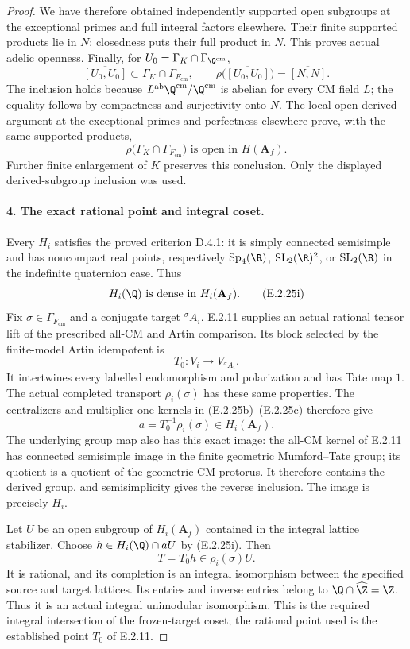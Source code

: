 \begin{proof}
We have therefore obtained independently supported
open subgroups at the exceptional primes and full
integral factors elsewhere. Their finite supported
products lie in \(N\); closedness puts their full
product in \(N\). This proves actual adelic openness.
Finally, for
\(U_0=\Gamma_K\cap\Gamma_{\Q^{\mathrm{cm}}}\),
\[
 \overline{[U_0,U_0]}
       \subset\Gamma_K\cap\Gamma_{F_{\mathrm{cm}}},
 \qquad
 \rho\bigl(\overline{[U_0,U_0]}\bigr)
       =\overline{[N,N]}.
\]
The inclusion holds because
\(L^{\mathrm{ab}}\Q^{\mathrm{cm}}/
\Q^{\mathrm{cm}}\) is abelian for every CM field
\(L\); the equality follows by compactness and
surjectivity onto \(N\). The local open-derived
argument at the exceptional primes and perfectness
elsewhere prove, with the same supported products,
\[
 \rho\bigl(\Gamma_K\cap\Gamma_{F_{\mathrm{cm}}}\bigr)
             \text{ is open in }H(\mathbf A_f).
 \tag{E.2.25h}
\]
Further finite enlargement of \(K\) preserves
this conclusion. Only the displayed derived-subgroup
inclusion was used.

\paragraph{4. The exact rational point and integral coset.}
Every \(H_i\) satisfies the proved criterion D.4.1:
it is simply connected semisimple and has noncompact
real points, respectively \(\operatorname{Sp}_4(\R)\),
\(\operatorname{SL}_2(\R)^2\), or
\(\operatorname{SL}_2(\R)\) in the indefinite
quaternion case. Thus
\[
 H_i(\Q)\text{ is dense in }H_i(\mathbf A_f).
 \tag{E.2.25i}
\]
Fix \(\sigma\in\Gamma_{F_{\mathrm{cm}}}\) and a
conjugate target \({}^{\sigma}A_i\). E.2.11 supplies
an actual rational tensor lift of the prescribed
all-CM and Artin comparison. Its block selected by
the finite-model Artin idempotent is
\[
 T_0:V_i\longrightarrow V_{{}^{\sigma}A_i}.
\]
It intertwines every labelled endomorphism and
polarization and has Tate map \(1\). The actual
completed transport \(\rho_i(\sigma)\) has these
same properties. The centralizers and multiplier-one
kernels in (E.2.25b)--(E.2.25c) therefore give
\[
 a=T_0^{-1}\rho_i(\sigma)\in H_i(\mathbf A_f).
 \tag{E.2.25j}
\]
The underlying group map also has this exact image:
the all-CM kernel of E.2.11 has connected semisimple
image in the finite geometric Mumford--Tate group;
its quotient is a quotient of the geometric CM
protorus. It therefore contains the derived group,
and semisimplicity gives the reverse inclusion.
The image is precisely \(H_i\).

Let \(U\) be an open subgroup of \(H_i(\mathbf A_f)\)
contained in the integral lattice stabilizer.
Choose \(h\in H_i(\Q)\cap aU\) by (E.2.25i).
Then
\[
 T=T_0h\in\rho_i(\sigma)U.
 \tag{E.2.25k}
\]
It is rational, and its completion is an integral
isomorphism between the specified source and target
lattices. Its entries and inverse entries belong to
\(\Q\cap\widehat\Z=\Z\). Thus it is an actual
integral unimodular isomorphism. This is the required
integral intersection of the frozen-target coset;
the rational point used is the established point
\(T_0\) of E.2.11.


\end{proof}
